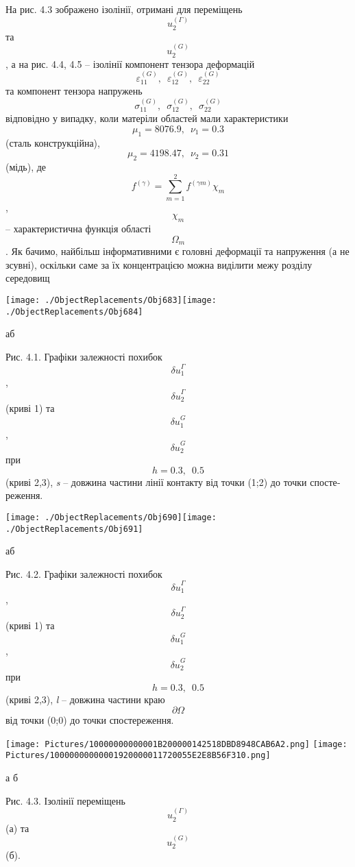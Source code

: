 На рис. 4.3 зображено ізолінії, отримані для переміщень
\[u_{2}^{(\Gamma)}{}\] та \[u_{2}^{(G)}{}\], а на рис. 4.4, 4.5 --
ізолінії компонент тензора деформацій
\[{\varepsilon_{\text{11}}^{(G)},\mspace{9mu}\varepsilon_{\text{12}}^{(G)},\mspace{9mu}\varepsilon_{\text{22}}^{(G)}}{}\]
та компонент тензора напружень
\[{\sigma_{\text{11}}^{(G)},\mspace{9mu}\sigma_{\text{12}}^{(G)},\mspace{9mu}\sigma_{\text{22}}^{(G)}}{}\]
відповідно у випадку, коли матеріли областей мали характеристики
\[{{\mu_{1} = \text{8076}}\text{.}9,\mspace{9mu}{\nu_{1} = 0}\text{.}3}{}\]\textsubscript{
}(сталь конструкційна),
\[{{\mu_{2} = \text{4198}}\text{.}\text{47},\mspace{9mu}{\nu_{2} = 0}\text{.}\text{31}}{}\]
(мідь), де
\[{{f^{(\gamma)} = {\sum_{m = 1}^{2}f^{(\mathit{\gamma m})}}}\chi_{m}}{}\],
\[\chi_{m}{}\] -- характеристична функція області \[\Omega_{m}{}\]. Як
бачимо, найбільш інформативними є головні деформації та напруження (а не
зсувні), оскільки саме за їх концентрацією можна виділити межу розділу
середовищ

\texttt{[image: ./ObjectReplacements/Obj683]}\texttt{[image: ./ObjectReplacements/Obj684]}

аб

Рис. 4.1. Графіки залежності похибок
\[\mathit{\delta u}_{1}^{\Gamma}{}\],
\[\mathit{\delta u}_{2}^{\Gamma}{}\] (криві 1) та
\[\mathit{\delta u}_{1}^{G}{}\], \[\mathit{\delta u}_{2}^{G}{}\] при
\[{{h = 0}\text{.}3,\mspace{9mu} 0\text{.}5}{}\](криві 2,3), \emph{s }--
довжина частини лінії контакту від точки (1;2) до точки спосте­реження.

\texttt{[image: ./ObjectReplacements/Obj690]}\texttt{[image: ./ObjectReplacements/Obj691]}

аб

Рис. 4.2. Графіки залежності похибок
\[\mathit{\delta u}_{1}^{\Gamma}{}\],
\[\mathit{\delta u}_{2}^{\Gamma}{}\] (криві 1) та
\[\mathit{\delta u}_{1}^{G}{}\], \[\mathit{\delta u}_{2}^{G}{}\] при
\[{{h = 0}\text{.}3,\mspace{9mu} 0\text{.}5}{}\](криві 2,3), \emph{l }--
довжина частини краю \[{\partial\Omega}{}\] від точки (0;0) до точки
спосте­реження.

\texttt{[image: Pictures/10000000000001B200000142518DBD8948CAB6A2.png]}
\texttt{[image: Pictures/10000000000001920000011720055E2E8B56F310.png]}

а б

Рис. 4.3. Ізолінії переміщень \[u_{2}^{(\Gamma)}{}\] (а) та
\[u_{2}^{(G)}{}\] (б).

